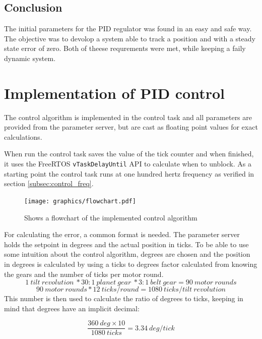 \subsection{Conclusion}
The initial parameters for the PID regulator was found in an easy and safe way. The objective was to devolop a system able to track a position and with a steady state error of zero. Both of theese requrements were met, while keeping a faily dynamic system.


\section{Implementation of PID control}
The control algorithm is implemented in the control task and all parameters are provided from the parameter server, but are cast as  floating point values for exact calculations.

When run the control task saves the value of the tick counter and when finished, it uses the FreeRTOS \texttt{vTaskDelayUntil} API to calculate when to unblock. As a starting point the control task runs at one hundred hertz frequency as verified in section \ref{subsec:control_freq}.

\begin{figure}[htb]
	\centering
	\texttt{[image: graphics/flowchart.pdf]}
	\caption{Shows a flowchart of the implemented control algorithm}
	\label{fig:pid_flow}			
\end{figure}

For calculating the error, a common format is needed. The parameter server holds the setpoint in degrees and the actual position in ticks. To be able to use some intuition about the control algorithm, degrees are chosen and the position in degrees is calculated by using a ticks to degrees factor calculated from knowing the gears and the number of ticks per motor round.
\begin{equation}
1 \ tilt \ revolution \ * 30:1 \ planet \ gear \ * 3:1 \ belt \ gear = 90 \ motor \ rounds
\end{equation}
\begin{equation}
 90 \ motor \ rounds * 12 \ ticks/round = 1080 \ ticks/tilt \ revolution
\end{equation}
This number is then used to calculate the ratio of degrees to ticks, keeping in mind that degrees have an implicit decimal:

\begin{equation}
\frac{360 \ deg \times 10}{1080 \ ticks} = 3.34\ deg/tick 
\end{equation}

